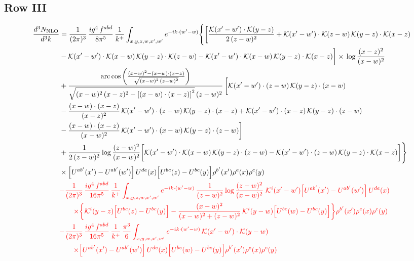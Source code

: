 \documentclass[9pt]{article}
\numberwithin{equation}{section}
\newcommand{\chg}[1]{{\color{red}#1}}
\begin{document}
\subsection{Row III}
\begin{align}
\frac{d^{3}N_{\rm NLO}}{d^{3}k} &=\frac{1}{(2\pi)^{3}}\,\frac{ig^{4}\,f^{abd}}{8\pi^{5}}\,\frac{1}{k^{+}}\int_{x,y,z,w,x',w'}e^{-ik\cdot(w'-w)}\Bigg\{\bigg[\frac{\mathcal{K}(x'-w')\cdot\mathcal{K}(y-z)}{2\,(z-w)^{2}}+\mathcal{K}(x'-w')\cdot\mathcal{K}(z-w)\,\mathcal{K}(y-z)\cdot\mathcal{K}(x-z)\notag \\
&-\mathcal{K}(x'-w')\cdot\mathcal{K}(x-w)\,\mathcal{K}(y-z)\cdot\mathcal{K}(z-w)-\mathcal{K}(x'-w')\cdot\mathcal{K}(x-w)\,\mathcal{K}(y-z)\cdot\mathcal{K}(x-z)\bigg]\times\, \log\frac{(x-z)^{2}}{(x-w)^{2}}\notag \\
&+\frac{\mathrm{arc\,cos}\left(\frac{(x-w)^{2}-(x-w)\cdot (x-z)}{\sqrt{(x-w)^{2}\,(z-w)^{2}}}\right)}{\sqrt{(x-w)^{2}\,(x-z)^{2}-\left[(x-w)\cdot (x-z)\right]^{2}}\,(z-w)^{2}}\,\bigg[\mathcal{K}(x'-w')\cdot(z-w)\,\mathcal{K}(y-z)\cdot(x-w)\notag \\ & -\frac{(x-w)\cdot(x-z)}{(x-z)^{2}}\,\mathcal{K}(x'-w')\cdot(z-w)\,\mathcal{K}(y-z)\cdot(x-z)+\mathcal{K}(x'-w')\cdot(x-z)\,\mathcal{K}(y-z)\cdot(z-w)\notag \\ & -\frac{(x-w)\cdot(x-z)}{(x-w)^{2}}\,\mathcal{K}(x'-w')\cdot(x-w)\,\mathcal{K}(y-z)\cdot(z-w)\bigg]\notag \\
&+\frac{1}{2\,(z-w)^{2}}\log\frac{(z-w)^{2}}{(x-w)^{2}}\bigg[\mathcal{K}(x'-w')\cdot\mathcal{K}(x-w)\,\mathcal{K}(y-z)\cdot(z-w)-\mathcal{K}(x'-w')\cdot(z-w)\,\mathcal{K}(y-z)\cdot\mathcal{K}(x-z)\bigg]\Bigg\}\notag\\
&\times\Big[U^{ab'}(x')-U^{ab'}(w')\Big]\,U^{de}(x)\Big[U^{bc}(z)-U^{bc}(y)\Big]\rho^{b'}(x')\rho^{e}(x)\rho^{c}(y)\notag\\
&\chg{-\frac{1}{(2\pi)^{3}}\,\frac{ig^{4}\,f^{abd}}{16\pi^{5}}\,\frac{1}{k^{+}}\int_{x,y,z,w,x',w'}e^{-ik\cdot(w'-w)}\,\frac{1}{(z-w)^{2}}\log\frac{(z-w)^{2}}{(x-w)^{2}}\;\mathcal{K}^{i}(x'-w')\Big[U^{ab'}(x')-U^{ab'}(w')\Big]\,U^{de}(x)}\notag\\
&\chg{\qquad\times\bigg\{\mathcal{K}^{i}(y-z)\Big[U^{bc}(z)-U^{bc}(y)\Big]-\frac{(x-w)^{2}}{(x-w)^{2}+(z-w)^{2}}\,\mathcal{K}^{i}(y-w)\Big[U^{bc}(w)-U^{bc}(y)\Big]\bigg\}\rho^{b'}(x')\rho^{e}(x)\rho^{c}(y)}\notag\\
&\chg{-\frac{1}{(2\pi)^{3}}\,\frac{ig^{4}\,f^{abd}}{16\pi^{5}}\,\frac{1}{k^{+}}\,\frac{\pi^{3}}{6}\int_{x,y,w,x',w'}e^{-ik\cdot(w'-w)}\,\mathcal{K}(x'-w')\cdot\mathcal{K}(y-w)}\notag\\
&\chg{\qquad\times\Big[U^{ab'}(x')-U^{ab'}(w')\Big]\,U^{de}(x)\Big[U^{bc}(w)-U^{bc}(y)\Big]\rho^{b'}(x')\rho^{e}(x)\rho^{c}(y)}
\end{align}
\end{document}
